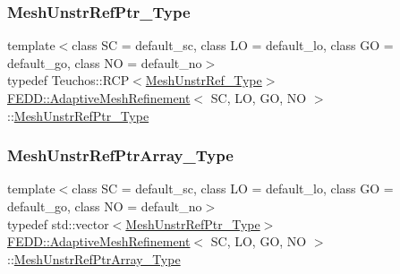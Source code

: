 \mbox{\label{classFEDD_1_1AdaptiveMeshRefinement_ad166d4fc2a5e64ed6c4b5ee3941c77bf}} 
\subsubsection{\texorpdfstring{Mesh\+Unstr\+Ref\+Ptr\+\_\+\+Type}{MeshUnstrRefPtr\_Type}}
{\footnotesize\ttfamily template$<$class SC  = default\+\_\+sc, class LO  = default\+\_\+lo, class GO  = default\+\_\+go, class NO  = default\+\_\+no$>$ \\
typedef Teuchos\+::\+R\+CP$<$\hyperlink{classFEDD_1_1AdaptiveMeshRefinement_ade0625d6a1aa9c3586f3b04abb0a9e5e}{Mesh\+Unstr\+Ref\+\_\+\+Type}$>$ \hyperlink{classFEDD_1_1AdaptiveMeshRefinement}{F\+E\+D\+D\+::\+Adaptive\+Mesh\+Refinement}$<$ SC, LO, GO, NO $>$\+::\hyperlink{classFEDD_1_1AdaptiveMeshRefinement_ad166d4fc2a5e64ed6c4b5ee3941c77bf}{Mesh\+Unstr\+Ref\+Ptr\+\_\+\+Type}}

\mbox{\label{classFEDD_1_1AdaptiveMeshRefinement_a9d1410723e7af7a2835cc294934fba65}} 
\subsubsection{\texorpdfstring{Mesh\+Unstr\+Ref\+Ptr\+Array\+\_\+\+Type}{MeshUnstrRefPtrArray\_Type}}
{\footnotesize\ttfamily template$<$class SC  = default\+\_\+sc, class LO  = default\+\_\+lo, class GO  = default\+\_\+go, class NO  = default\+\_\+no$>$ \\
typedef std\+::vector$<$\hyperlink{classFEDD_1_1AdaptiveMeshRefinement_ad166d4fc2a5e64ed6c4b5ee3941c77bf}{Mesh\+Unstr\+Ref\+Ptr\+\_\+\+Type}$>$ \hyperlink{classFEDD_1_1AdaptiveMeshRefinement}{F\+E\+D\+D\+::\+Adaptive\+Mesh\+Refinement}$<$ SC, LO, GO, NO $>$\+::\hyperlink{classFEDD_1_1AdaptiveMeshRefinement_a9d1410723e7af7a2835cc294934fba65}{Mesh\+Unstr\+Ref\+Ptr\+Array\+\_\+\+Type}}

